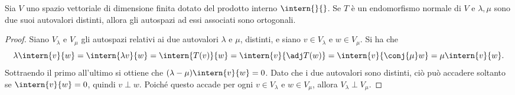 \begin{proprieta} \label{pr:autospazi-ortogonali}
	Sia $V$ uno spazio vettoriale di dimensione finita dotato del prodotto interno $\intern{}{}$.
	Se $T$ è un endomorfismo normale di $V$ e $\lambda,\mu$ sono due suoi autovalori distinti, allora gli autospazi ad essi associati sono ortogonali.
\end{proprieta}
\begin{proof}
	Siano $V_\lambda$ e $V_\mu$ gli autospazi relativi ai due autovalori $\lambda$ e $\mu$, distinti, e siano $  v\in V_\lambda$ e $  w\in V_\mu$.
	Si ha che
	\begin{equation}
		\lambda\intern{  v}{  w}=\intern{\lambda  v}{  w}=\intern{T(  v)}{  w}=\intern{  v}{\adj T(  w)}=\intern{  v}{\conj{\mu}  w}=\mu\intern{  v}{  w}.
	\end{equation}
	Sottraendo il primo all'ultimo si ottiene che $(\lambda-\mu)\intern{  v}{  w}=0$.
	Dato che i due autovalori sono distinti, ciò può accadere soltanto se $\intern{  v}{  w}=0$, quindi $  v\perp   w$.
	Poich\'e questo accade per ogni $  v\in V_\lambda$ e $  w\in V_\mu$, allora $V_\lambda\perp V_\mu$.
\end{proof}

